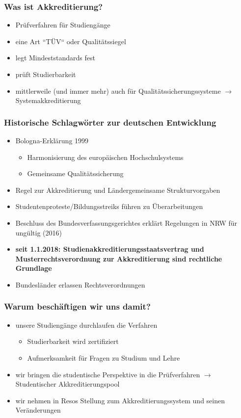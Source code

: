 \documentclass{beamer}
\begin{document}
\frame{\tableofcontents[currentsection]}
\begin{frame}
  \frametitle{Was ist Akkreditierung?}
  \begin{itemize}
  	\item Prüfverfahren für Studiengänge
  	\item eine Art ``TÜV`` oder Qualitätssiegel
  	\item legt Mindeststandards fest
  	\item prüft Studierbarkeit
  	\vspace{1cm}
  	\item mittlerweile (und immer mehr) auch für Qualitätssicherungssysteme $\rightarrow$ Systemakkreditierung
  \end{itemize}   
\end{frame}
\begin{frame} 
  \frametitle{Historische Schlagwörter zur deutschen Entwicklung} 
  \begin{itemize}
  	\item Bologna-Erklärung 1999
  		\begin{itemize}
  			\item Harmonisierung des europäischen Hochschulsystems
  			\item Gemeinsame Qualitätssicherung
  		\end{itemize}
  	\pause
  	\item Regel zur Akkreditierung und Ländergemeinsame Strukturvorgaben
  	\item Studentenproteste/Bildungsstreiks führen zu Überarbeitungen
  	\item Beschluss des Bundesverfassungsgerichtes erklärt Regelungen in NRW für ungültig (2016)
  	\vspace{1cm}
  	\pause
  	\item \textbf{seit 1.1.2018: Studienakkreditierungsstaatsvertrag und Musterrechtsverordnung zur Akkreditierung sind rechtliche Grundlage}
  	\item Bundesländer erlassen Rechtsverordnungen
  \end{itemize}   
\end{frame}
\begin{frame} 
  \frametitle{Warum beschäftigen wir uns damit?} 
  \begin{itemize}
  	\item unsere Studiengänge durchlaufen die Verfahren
  		\begin{itemize}
  			\item Studierbarkeit wird zertifiziert
  			\item Aufmerksamkeit für Fragen zu Studium und Lehre
  		\end{itemize}
  	\pause
  	\item wir bringen die studentische Perspektive in die Prüfverfahren $\rightarrow$ Studentischer Akkreditierungspool
  	\pause
  	\item wir nehmen in Resos Stellung zum Akkreditierungssystem und seinen Veränderungen
  \end{itemize}   
\end{frame}
\end{document}
